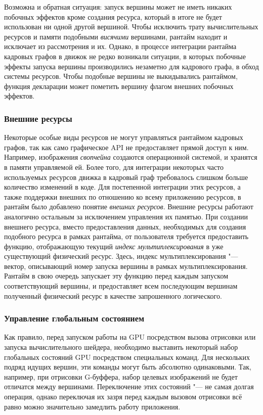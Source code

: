 Возможна и обратная ситуация: запуск вершины может не иметь никаких побочных эффектов кроме создания ресурса, который в итоге не будет использован ни одной другой вершиной.
Чтобы исключить трату вычислительных ресурсов и памяти подобными \textit{висячими} вершинами, рантайм находит и исключает из рассмотрения и их.
Однако, в процессе интеграции рантайма кадровых графов в движок не редко возникали ситуации, в которых побочные эффекты запуска вершины производились незаметно для кадрового графа, в обход системы ресурсов.
Чтобы подобные вершины не выкидывались рантаймом, функция декларации может пометить вершину флагом внешних побочных эффектов.

\subsubsection{Внешние ресурсы}
Некоторые особые виды ресурсов не могут управляться рантаймом кадровых графов, так как само графическое API не предоставляет прямой доступ к ним.
Например, изображения \textit{свопчейна} создаются операционной системой, и хранятся в памяти управляемой ей.
Более того, для интеграции некоторых часто используемых ресурсов движка в кадровый граф требовалось слишком больше количество изменений в коде.
Для постепенной интеграции этих ресурсов, а также поддержки внешних по отношению ко всему приложению ресурсов, в рантайм было добавлено понятие \textit{внешних ресурсов}.
Внешние ресурсы работают аналогично остальным за исключением управления их памятью.
При создании внешнего ресурса, вместо предоставления данных, необходимых для создания подобного ресурса в рамках рантайма, от пользователя требуется предоставить функцию, отображающую текущий \textit{индекс мультиплексирования} в уже существующий физический ресурс.
Здесь, индекс мультиплексирования "--- вектор, описывающий номер запуска вершины в рамках мультиплексирования.
Рантайм в свою очередь запускает эту функцию перед каждым запуском соответствующий вершины, и предоставляет всем последующим вершинам полученный физический ресурс в качестве запрошенного логического.

\subsubsection{Управление глобальным состоянием}
Как правило, перед запуском работы на GPU посредством вызова отрисовки или запуска вычислительного шейдера, необходимо выставить некоторый набор глобальных состояний GPU посредством специальных команд.
Для нескольких подряд идущих вершин, эти команды могут быть абсолютно одинаковыми.
Так, например, при отрисовки G-буффера, набор целевых изображений не будет отличатся между вершинами.
Переключение этих состояний "--- не самая долгая операция, однако переключая их зазря перед каждым вызовом отрисовки всё равно можно значительно замедлить работу приложения.


